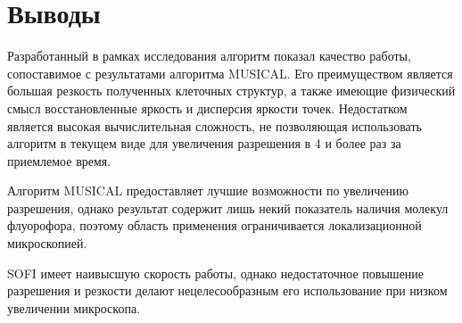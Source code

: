 \section{Выводы}

Разработанный в рамках исследования алгоритм показал качество работы, сопоставимое с результатами алгоритма MUSICAL. Его преимуществом является большая резкость полученных клеточных структур, а также имеющие физический смысл восстановленные яркость и дисперсия яркости точек. Недостатком является высокая вычислительная сложность, не позволяющая использовать алгоритм в текущем виде для увеличения разрешения в 4 и более раз за приемлемое время.

Алгоритм MUSICAL предоставляет лучшие возможности по увеличению разрешения, однако результат содержит лишь некий показатель наличия молекул флуорофора, поэтому область применения ограничивается локализационной микроскопией.

SOFI имеет наивысшую скорость работы, однако недостаточное повышение разрешения и резкости делают нецелесообразным его использование при низком увеличении микроскопа.




\FloatBarrier